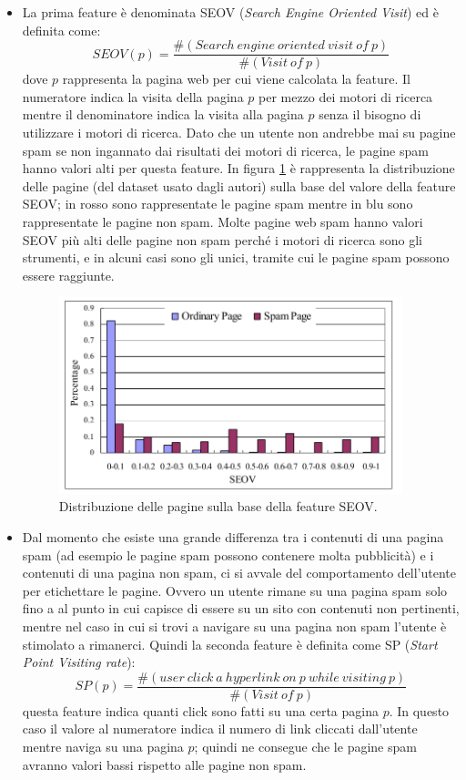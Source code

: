 \begin{itemize}
 \item La prima feature è denominata SEOV (\textit{Search Engine Oriented Visit}) ed è definita come:
 \begin{equation}
  SEOV(p)=\frac{\#(Search\ engine\ oriented\ visit\ of\ p)}{\#(Visit\ of\ p)}
 \end{equation}
  dove \(p\) rappresenta la pagina web per cui viene calcolata la feature.  Il numeratore indica la visita della pagina \(p\) per mezzo dei motori di ricerca mentre il denominatore indica la visita alla pagina \(p\) senza il bisogno di utilizzare i motori di ricerca. Dato che un utente non andrebbe mai su pagine spam se non ingannato dai risultati dei motori di ricerca, le pagine spam hanno valori alti per questa feature. In figura \ref{img:seov} è rappresenta la distribuzione delle pagine (del dataset usato dagli autori) sulla base del valore della feature SEOV; in rosso sono rappresentate le pagine spam mentre in blu sono rappresentate le pagine non spam. Molte pagine web spam hanno valori SEOV più alti delle pagine non spam perché i motori di ricerca sono gli strumenti, e in alcuni casi sono gli unici, tramite cui le pagine spam possono essere raggiunte.
\begin{figure}
\centering
\includegraphics[width=10cm]{immagini/altre/seov.png}
\caption{Distribuzione delle pagine sulla base della feature SEOV.}
\label{img:seov}
\end{figure}
  
 \item Dal momento che esiste una grande differenza tra i contenuti di una pagina spam (ad esempio le pagine spam possono contenere molta pubblicità) e i contenuti di una pagina non spam, ci si avvale del comportamento dell'utente per etichettare le pagine. Ovvero un utente rimane su una pagina spam solo fino a al punto in cui capisce di essere su un sito con contenuti non pertinenti, mentre nel caso in cui si trovi a navigare su una pagina non spam l'utente è stimolato a rimanerci. Quindi la seconda feature è definita come SP (\textit{Start Point Visiting rate}):
 \begin{equation}
  SP(p)=\frac{\#(user\ click\ a\ hyperlink\ on\ p\ while\ visiting\ p)}{\#(Visit\ of\ p)}
 \end{equation}
 questa feature indica quanti click sono fatti su una certa pagina \(p\). In questo caso il valore al numeratore indica il numero di link cliccati dall'utente mentre naviga su una pagina \(p\); quindi ne consegue che le pagine spam avranno valori bassi rispetto alle pagine non spam.
 

\end{itemize}
